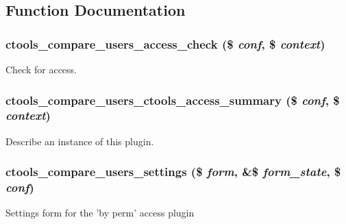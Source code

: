 \subsection{Function Documentation}
\hypertarget{compare__users_8inc_a99588e3a4b2aca3600c012d023946f59}{
\subsubsection[{ctools\_\-compare\_\-users\_\-access\_\-check}]{\setlength{\rightskip}{0pt plus 5cm}ctools\_\-compare\_\-users\_\-access\_\-check (\$ {\em conf}, \/  \$ {\em context})}}
\label{compare__users_8inc_a99588e3a4b2aca3600c012d023946f59}
Check for access. \hypertarget{compare__users_8inc_abdbf94f4ca0174cc454de896d28212d6}{
\subsubsection[{ctools\_\-compare\_\-users\_\-ctools\_\-access\_\-summary}]{\setlength{\rightskip}{0pt plus 5cm}ctools\_\-compare\_\-users\_\-ctools\_\-access\_\-summary (\$ {\em conf}, \/  \$ {\em context})}}
\label{compare__users_8inc_abdbf94f4ca0174cc454de896d28212d6}
Describe an instance of this plugin. \hypertarget{compare__users_8inc_af3b8eb77737a7faf1968b2e43937fd7e}{
\subsubsection[{ctools\_\-compare\_\-users\_\-settings}]{\setlength{\rightskip}{0pt plus 5cm}ctools\_\-compare\_\-users\_\-settings (\$ {\em form}, \/  \&\$ {\em form\_\-state}, \/  \$ {\em conf})}}
\label{compare__users_8inc_af3b8eb77737a7faf1968b2e43937fd7e}
Settings form for the 'by perm' access plugin 

